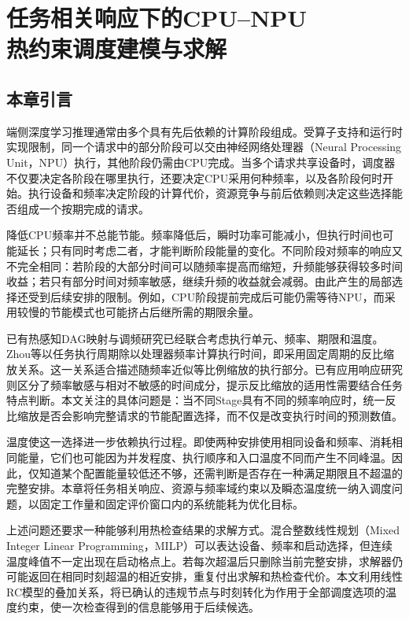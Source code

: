 \chapter[任务相关响应下的CPU--NPU热约束调度建模与求解]{任务相关响应下的CPU--NPU\\热约束调度建模与求解}
\label{chap:model}

\section{本章引言}

端侧深度学习推理通常由多个具有先后依赖的计算阶段组成。受算子支持和运行时实现限制，同一个请求中的部分阶段可以交由神经网络处理器（Neural Processing Unit，NPU）执行，其他阶段仍需由CPU完成。当多个请求共享设备时，调度器不仅要决定各阶段在哪里执行，还要决定CPU采用何种频率，以及各阶段何时开始。执行设备和频率决定阶段的计算代价，资源竞争与前后依赖则决定这些选择能否组成一个按期完成的请求。

降低CPU频率并不总能节能。频率降低后，瞬时功率可能减小，但执行时间也可能延长；只有同时考虑二者，才能判断阶段能量的变化。不同阶段对频率的响应又不完全相同：若阶段的大部分时间可以随频率提高而缩短，升频能够获得较多时间收益；若只有部分时间对频率敏感，继续升频的收益就会减弱。由此产生的局部选择还受到后续安排的限制。例如，CPU阶段提前完成后可能仍需等待NPU，而采用较慢的节能模式也可能挤占后继所需的期限余量。

已有热感知DAG映射与调频研究已经联合考虑执行单元、频率、期限和温度。Zhou等以任务执行周期除以处理器频率计算执行时间，即采用固定周期的反比缩放关系\cite{source1}。这一关系适合描述随频率近似等比例缩放的执行部分。已有应用响应研究则区分了频率敏感与相对不敏感的时间成分\cite{source2}，提示反比缩放的适用性需要结合任务特点判断。本文关注的具体问题是：当不同Stage具有不同的频率响应时，统一反比缩放是否会影响完整请求的节能配置选择，而不仅是改变执行时间的预测数值。

温度使这一选择进一步依赖执行过程。即使两种安排使用相同设备和频率、消耗相同能量，它们也可能因为并发程度、执行顺序和入口温度不同而产生不同峰温。因此，仅知道某个配置能量较低还不够，还需判断是否存在一种满足期限且不超温的完整安排。本章将任务相关响应、资源与频率域约束以及瞬态温度统一纳入调度问题，以固定工作量和固定评价窗口内的系统能耗为优化目标。

上述问题还要求一种能够利用热检查结果的求解方式。混合整数线性规划（Mixed Integer Linear Programming，MILP）可以表达设备、频率和启动选择，但连续温度峰值不一定出现在启动格点上。若每次超温后只删除当前完整安排，求解器仍可能返回在相同时刻超温的相近安排，重复付出求解和热检查代价。本文利用线性RC模型的叠加关系，将已确认的违规节点与时刻转化为作用于全部调度选项的温度约束，使一次检查得到的信息能够用于后续候选。

